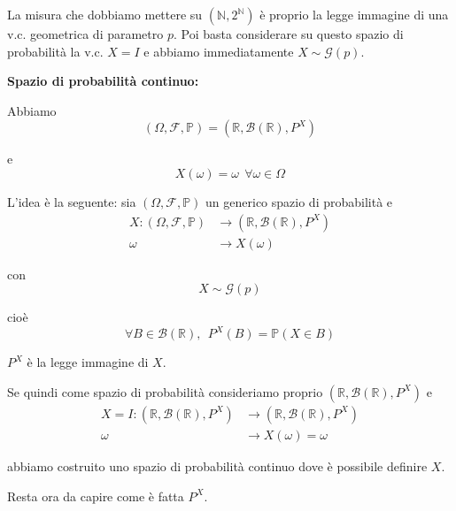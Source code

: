 \begin{enumerate}
\begin{oss}
La misura che dobbiamo mettere su $\left(\mathbb{N} ,2^{\mathbb{N}}\right)$ è proprio la legge immagine di una v.c. geometrica di parametro $p$. Poi basta considerare su questo spazio di probabilità la v.c. $X=I$ e abbiamo immediatamente $X\sim \mathcal{G}( p)$.
\end{oss}

\textbf{Spazio di probabilità continuo:}

Abbiamo\begin{equation*}
( \Omega ,\mathcal{F} ,\mathbb{P}) =\left(\mathbb{R} ,\mathcal{B}(\mathbb{R}) ,P^{X}\right)
\end{equation*}

e\begin{equation*}
X( \omega ) =\omega \ \ \forall \omega \in \Omega 
\end{equation*}

L'idea è la seguente: sia $( \Omega ,\mathcal{F} ,\mathbb{P})$ un generico spazio di probabilità e\begin{align*}
X:( \Omega ,\mathcal{F} ,\mathbb{P}) & \rightarrow \left(\mathbb{R} ,\mathcal{B}(\mathbb{R}) ,P^{X}\right)\\
\omega  & \rightarrow X( \omega )
\end{align*}

con\begin{equation*}
X\sim \mathcal{G}( p)
\end{equation*}

cioè\begin{equation*}
\forall B\in \mathcal{B}(\mathbb{R}) ,\ \ P^{X}( B) =\mathbb{P}( X\in B)
\end{equation*}

$P^{X}$ è la legge immagine di $X$.

Se quindi come spazio di probabilità consideriamo proprio $\left(\mathbb{R} ,\mathcal{B}(\mathbb{R}) ,P^{X}\right)$ e\begin{align*}
X=I:\left(\mathbb{R} ,\mathcal{B}(\mathbb{R}) ,P^{X}\right) & \rightarrow \left(\mathbb{R} ,\mathcal{B}(\mathbb{R}) ,P^{X}\right)\\
\omega  & \rightarrow X( \omega ) =\omega 
\end{align*}

abbiamo costruito uno spazio di probabilità continuo dove è possibile definire $X$.

Resta ora da capire come è fatta $P^{X}$.
\end{enumerate}
